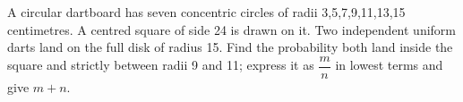 A circular dartboard has seven concentric circles of radii 3,5,7,9,11,13,15 centimetres. A centred square of side 24 is drawn on it. Two independent uniform darts land on the full disk of radius 15. Find the probability both land inside the square and strictly between radii 9 and 11; express it as $\dfrac{m}{n}$ in lowest terms and give $m+n$.
